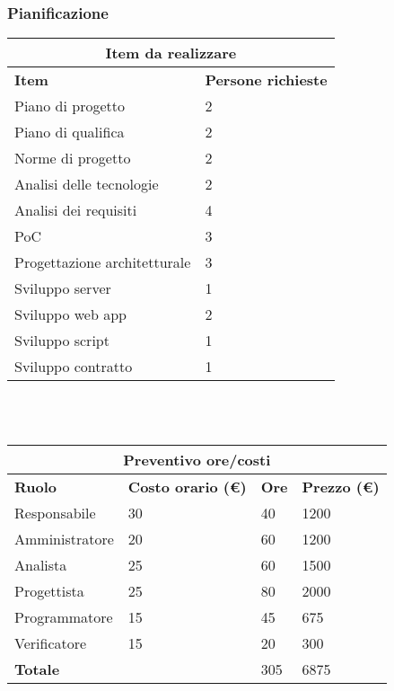 \documentclass[a4paper, 12pt]{article}
\begin{document}
\subsubsection{Pianificazione}\mbox{}

\begin{center}
    \begin{tabularx}{\textwidth}{|X|X|}
        \hline
        \multicolumn{2}{|c|}{\textbf{Item da realizzare}}\\
        \hline
        \hline
        \textbf{Item} & \textbf{Persone richieste}\\
        \hline
        Piano di progetto & 2\\
        \hline
        Piano di qualifica & 2\\
        \hline
        Norme di progetto & 2\\
        \hline
        Analisi delle tecnologie & 2\\
        \hline
        Analisi dei requisiti & 4\\
        \hline
        PoC & 3\\
        \hline
        Progettazione architetturale & 3\\
        \hline
        Sviluppo server & 1\\
        \hline
        Sviluppo web app & 2\\
        \hline
        Sviluppo script  & 1\\
        \hline
        Sviluppo contratto & 1\\
        \hline
    \end{tabularx}\\[8pt]
    \mbox{}\\
\end{center}

\begin{center}
    \begin{tabularx}{\textwidth}{|X|X|X|X|}
        \hline
        \multicolumn{4}{|c|}{\textbf{Preventivo ore/costi}}\\
        \hline
        \hline
        \textbf{Ruolo} & \textbf{Costo orario (\euro)} & \textbf{Ore} & \textbf{Prezzo (\euro)}\\
        \hline
        Responsabile    & 30 & 40  & 1200\\
        \hline
        Amministratore  & 20 & 60  & 1200\\
        \hline
        Analista        & 25 & 60  & 1500\\
        \hline
        Progettista     & 25 & 80  & 2000\\
        \hline
        Programmatore   & 15 & 45  & 675\\
        \hline
        Verificatore    & 15 & 20  & 300\\
        \hline
        \hline
        \textbf{Totale} &    & 305 & 6875\\
        \hline
    \end{tabularx}\\[8pt]
    \mbox{}\\
\end{center}
\end{document}
